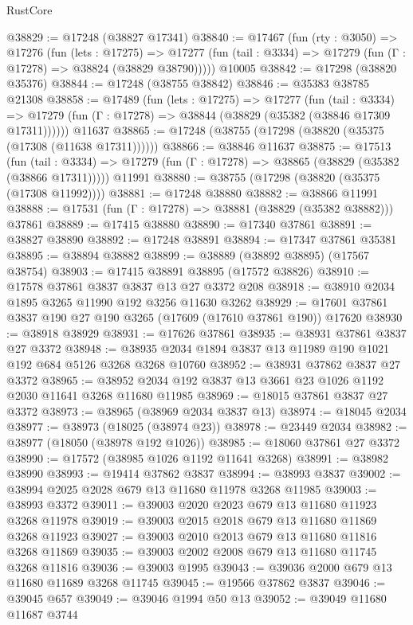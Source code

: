 \begin{lexlean}{RustCore}
\begin{coremodule}
@38829 := @17248 (@38827 @17341)
@38840 := @17467
    (fun (rty : @3050) =>
    @17276
      (fun (lets : @17275) =>
      @17277 (fun (tail : @3334) => @17279 (fun (Γ : @17278) => @38824 (@38829 @38790)))))
    @10005
@38842 := @17298 (@38820 @35376)
@38844 := @17248 (@38755 @38842)
@38846 := @35383 @38785 @21308
@38858 := @17489
    (fun (lets : @17275) =>
    @17277
      (fun (tail : @3334) =>
      @17279 (fun (Γ : @17278) => @38844 (@38829 (@35382 (@38846 @17309 @17311))))))
    @11637
@38865 := @17248 (@38755 (@17298 (@38820 (@35375 (@17308 (@11638 @17311))))))
@38866 := @38846 @11637
@38875 := @17513
    (fun (tail : @3334) => @17279 (fun (Γ : @17278) => @38865 (@38829 (@35382 (@38866 @17311)))))
    @11991
@38880 := @38755 (@17298 (@38820 (@35375 (@17308 @11992))))
@38881 := @17248 @38880
@38882 := @38866 @11991
@38888 := @17531 (fun (Γ : @17278) => @38881 (@38829 (@35382 @38882))) @37861
@38889 := @17415 @38880
@38890 := @17340 @37861
@38891 := @38827 @38890
@38892 := @17248 @38891
@38894 := @17347 @37861 @35381
@38895 := @38894 @38882
@38899 := @38889 (@38892 @38895) (@17567 @38754)
@38903 := @17415 @38891 @38895 (@17572 @38826)
@38910 := @17578 @37861 @3837 @3837 @13 @27 @3372 @208
@38918 := @38910 @2034 @1895 @3265 @11990 @192 @3256 @11630 @3262
@38929 := @17601 @37861 @3837 @190 @27 @190 @3265 (@17609 (@17610 @37861 @190)) @17620
@38930 := @38918 @38929
@38931 := @17626 @37861
@38935 := @38931 @37861 @3837 @27 @3372
@38948 := @38935 @2034 @1894 @3837 @13 @11989 @190 @1021 @192 @684 @5126 @3268 @3268 @10760
@38952 := @38931 @37862 @3837 @27 @3372
@38965 := @38952 @2034 @192 @3837 @13 @3661 @23 @1026 @1192 @2030 @11641 @3268 @11680 @11985
@38969 := @18015 @37861 @3837 @27 @3372
@38973 := @38965 (@38969 @2034 @3837 @13)
@38974 := @18045 @2034
@38977 := @38973 (@18025 (@38974 @23))
@38978 := @23449 @2034
@38982 := @38977 (@18050 (@38978 @192 @1026))
@38985 := @18060 @37861 @27 @3372
@38990 := @17572 (@38985 @1026 @1192 @11641 @3268)
@38991 := @38982 @38990
@38993 := @19414 @37862 @3837
@38994 := @38993 @3837
@39002 := @38994 @2025 @2028 @679 @13 @11680 @11978 @3268 @11985
@39003 := @38993 @3372
@39011 := @39003 @2020 @2023 @679 @13 @11680 @11923 @3268 @11978
@39019 := @39003 @2015 @2018 @679 @13 @11680 @11869 @3268 @11923
@39027 := @39003 @2010 @2013 @679 @13 @11680 @11816 @3268 @11869
@39035 := @39003 @2002 @2008 @679 @13 @11680 @11745 @3268 @11816
@39036 := @39003 @1995
@39043 := @39036 @2000 @679 @13 @11680 @11689 @3268 @11745
@39045 := @19566 @37862 @3837
@39046 := @39045 @657
@39049 := @39046 @1994 @50 @13
@39052 := @39049 @11680 @11687 @3744

\end{coremodule}
\end{lexlean}
